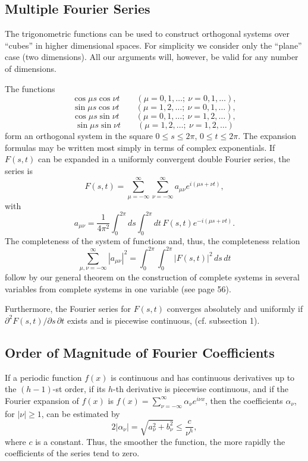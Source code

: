 \subsection{Multiple Fourier Series}
The trigonometric functions can be used to construct orthogonal systems over ``cubes'' in higher dimensional spaces. For simplicity we consider only the ``plane'' case (two dimensions). All our arguments will, however, be valid for any number of dimensions.

The functions
\[
\cos\mu s\cos\nu t\qquad(\mu=0,1,\ldots;\ \nu=0,1,\ldots),
\]
\[
\sin\mu s\cos\nu t\qquad(\mu=1,2,\ldots;\ \nu=0,1,\ldots),
\]
\[
\cos\mu s\sin\nu t\qquad(\mu=0,1,\ldots;\ \nu=1,2,\ldots),
\]
\[
\sin\mu s\sin\nu t\qquad(\mu=1,2,\ldots;\ \nu=1,2,\ldots)
\]
form an orthogonal system in the square $0\le s\le2\pi$, $0\le t\le2\pi$. The expansion formulas may be written most simply in terms of complex exponentials. If $F(s,t)$ can be expanded in a uniformly convergent double Fourier series, the series is
\[
F(s,t)=\sum_{\mu=-\infty}^{\infty}\sum_{\nu=-\infty}^{\infty}a_{\mu\nu}e^{i(\mu s+\nu t)},
\]
with
\[
a_{\mu\nu}=\frac1{4\pi^2}\int_{0}^{2\pi}\!ds\int_{0}^{2\pi}\!dt\,F(s,t)e^{-i(\mu s+\nu t)}.
\]
The completeness of the system of functions and, thus, the completeness relation
\[
\sum_{\mu,\nu=-\infty}^{\infty}|a_{\mu\nu}|^2
=\int_{0}^{2\pi}\int_{0}^{2\pi}|F(s,t)|^2\,ds\,dt
\]
follow by our general theorem on the construction of complete systems in several variables from complete systems in one variable (see page 56).

Furthermore, the Fourier series for $F(s,t)$ converges absolutely and uniformly if\newline $\partial^2F(s,t)/\partial s\,\partial t$ exists and is piecewise continuous, (cf. subsection 1).

\subsection{Order of Magnitude of Fourier Coefficients}
If a periodic function $f(x)$ is continuous and has continuous derivatives up to the $(h-1)$-st order, if its $h$-th derivative is piecewise continuous, and if the Fourier expansion of $f(x)$ is $f(x)=\sum_{\nu=-\infty}^{\infty}\alpha_\nu e^{i\nu x}$, then the coefficients $\alpha_\nu$, for $|\nu|\ge1$, can be estimated by
\[
2|\alpha_\nu|=\sqrt{a_\nu^2+b_\nu^2}\le\frac{c}{\nu^h},
\]
where $c$ is a constant. Thus, the smoother the function, the more rapidly the coefficients of the series tend to zero.

